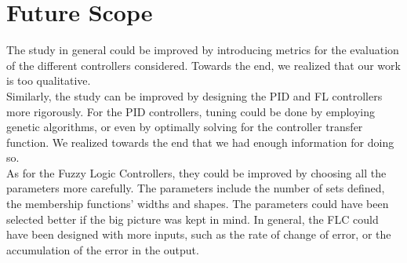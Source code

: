 \section{Future Scope}

The study in general could be improved by introducing metrics for the evaluation of the different controllers considered. Towards the end, we realized that our work is too qualitative. \\

Similarly, the study can be improved by designing the PID and FL controllers more rigorously. For the PID controllers, tuning could be done by employing genetic algorithms, or even by optimally solving for the controller transfer function. We realized towards the end that we had enough information for doing so. \\

As for the Fuzzy Logic Controllers, they could be improved by choosing all the parameters more carefully. The parameters include the number of sets defined, the membership functions' widths and shapes. The parameters could have been selected better if the big picture was kept in mind. In general, the FLC could have been designed with more inputs, such as the rate of change of error, or the accumulation of the error in the output. \\